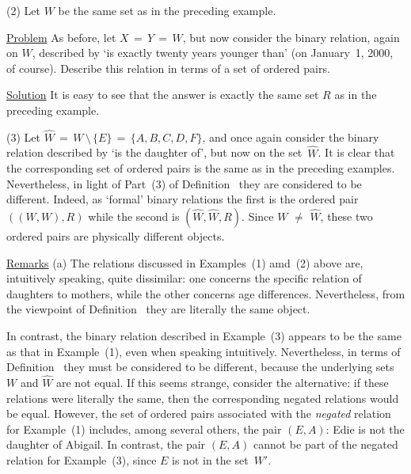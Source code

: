 {\V

        (2) Let $W$ be the same set as in the preceding example.

        \underline{Problem} As before, let $X \,=\, Y \,=\, W$, but now consider the binary relation,
    again on $W$, described by `is exactly twenty years younger than' (on January~1, 2000, of course).
    Describe this relation in terms of a set of ordered pairs.

        \underline{Solution} It is easy to see that the answer is exactly the same set $R$ as in the preceding example.

\V

        (3) Let $\hat{W} \,=\, W\,{\setminus}\,\{E\} \,=\, \{A, B, C, D, F\}$, and once again consider the binary relation described by `is the daughter of', but now on the set~$\hat{W}$.
    It is clear that the corresponding set of ordered pairs is the same as in the preceding examples.
    Nevertheless, in light of Part~(3) of Definition~ they are considered to be different.
    Indeed, as `formal' binary relations the first is the ordered pair $((W,W),R)$ while the second is $(\hat{W},\hat{W},R)$.
    Since $W \,\,{\neq}\,\, \hat{W}$, these two ordered pairs are physically different objects.

\V

        \underline{Remarks} (a) The relations discussed in Examples~(1) amd~(2) above are, intuitively speaking, quite dissimilar:
    one concerns the specific relation of daughters to mothers, while the other concerns age differences.
    Nevertheless, from the viewpoint of Definition~ they are literally the same object.

        In contrast, the binary relation described in Example~(3) appears to be the same as that in Example~(1), even when speaking intuitively.
    Nevertheless, in terms of Definition~ they must be considered to be different, because the underlying sets $W$ and $\hat{W}$ are not equal.
    If this seems strange, consider the alternative: if these relations were literally the same, then the corresponding negated relations would be equal.
    However, the set of ordered pairs associated with the {\em negated} relation for Example~(1) includes,
    among several others, the pair $(E,A)$: Edie is not the daughter of Abigail.
    In contrast, the pair $(E,A)$ cannot be part of the negated relation for Example~(3), since $E$ is not in the set~$W'$.


\VV

}
